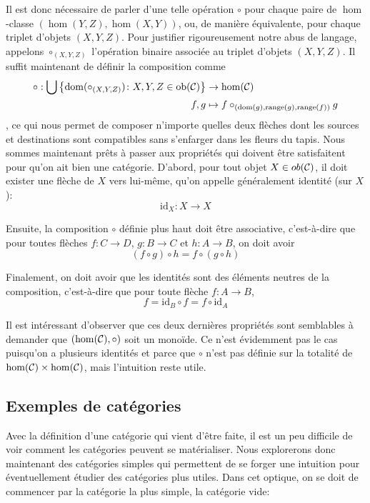 Il est donc nécessaire de parler d'une telle opération $\circ$ pour chaque
paire de $\hom$-classe $\left(\hom(Y, Z), \hom(X, Y)\right)$, ou, de manière
équivalente, pour chaque triplet d'objets $\left(X, Y, Z\right)$. Pour justifier
rigoureusement notre abus de langage, appelons $\circ_{\left(X,Y,Z\right)}$
l'opération binaire associée au triplet d'objets $\left(X,Y,Z\right)$.
Il suffit maintenant de définir la composition comme
\begin{align*}
    \circ : \bigcup \left\{ \mathrm{dom}(\circ_{\left(X,Y,Z\right)})
                            \colon X, Y, Z \in \mathrm{ob}(\mathcal{C}) \right\} &\to \hom(\mathcal{C}) \\
           f, g &\mapsto f \circ_{\left(\mathrm{dom}(g), \mathrm{range}(g), \mathrm{range}(f)\right)} g
\end{align*}
, ce qui nous permet de composer n'importe quelles deux flèches dont les sources
et destinations sont compatibles sans s'enfarger dans les fleurs du tapis. Nous
sommes maintenant prêts à passer aux propriétés qui doivent être satisfaitent
pour qu'on ait bien une catégorie. D'abord, pour tout objet $X \in ob(\mathcal{C})$, il
doit exister une flèche de $X$ vers lui-même, qu'on appelle généralement
identité (sur $X$):
\[
    \mathrm{id}_X : X \to X
\]

Ensuite, la composition $\circ$ définie plus haut doit être associative,
c'est-à-dire que pour toutes flèches $f : C \to D$, $g : B \to C$ et
$h : A \to B$, on doit avoir
\[
    (f \circ g) \circ h = f \circ (g \circ h)
\]

Finalement, on doit avoir que les identités sont des éléments neutres de la
composition, c'est-à-dire que pour toute flèche $f : A \to B$,
\[
    f = \mathrm{id}_B \circ f = f \circ \mathrm{id}_A
\]

Il est intéressant d'observer que ces deux dernières propriétés sont
semblables à demander que $\left(\hom(\mathcal{C}), \circ\right)$ soit un monoïde.
Ce n'est évidemment pas le cas puisqu'on a plusieurs identités et parce
que $\circ$ n'est pas définie sur la totalité de $\hom(\mathcal{C}) \times \hom(\mathcal{C})$,
mais l'intuition reste utile.


\subsection{Exemples de catégories}
Avec la définition d'une catégorie qui vient d'être faite, il est un peu
difficile de voir comment les catégories peuvent se matérialiser. Nous
explorerons donc maintenant des catégories simples qui permettent de se
forger une intuition pour éventuellement étudier des catégories plus utiles.
Dans cet optique, on se doit de commencer par la catégorie la plus simple,
la catégorie vide:


